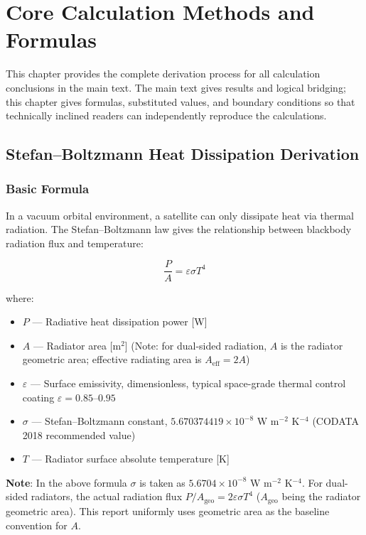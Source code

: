 
\section{Core Calculation Methods and Formulas}

This chapter provides the complete derivation process for all calculation conclusions in the main text. The main text gives results and logical bridging; this chapter gives formulas, substituted values, and boundary conditions so that technically inclined readers can independently reproduce the calculations.

\subsection{Stefan--Boltzmann Heat Dissipation Derivation}
\label{sec:sb-derivation}

\subsubsection{Basic Formula}

In a vacuum orbital environment, a satellite can only dissipate heat via thermal radiation. The Stefan--Boltzmann law gives the relationship between blackbody radiation flux and temperature:

\begin{equation}
  \frac{P}{A} = \varepsilon \sigma T^{4}
  \label{eq:sb-basic}
\end{equation}

where:
\begin{itemize}
  \item $P$ --- Radiative heat dissipation power [W]
  \item $A$ --- Radiator area [m$^2$] (Note: for dual-sided radiation, $A$ is the radiator geometric area; effective radiating area is $A_{\text{eff}} = 2A$)
  \item $\varepsilon$ --- Surface emissivity, dimensionless, typical space-grade thermal control coating $\varepsilon = 0.85\text{--}0.95$
  \item $\sigma$ --- Stefan--Boltzmann constant, $5.670374419 \times 10^{-8}$ W m$^{-2}$ K$^{-4}$ (CODATA 2018 recommended value)
  \item $T$ --- Radiator surface absolute temperature [K]
\end{itemize}

\textbf{Note}: In the above formula $\sigma$ is taken as $5.6704 \times 10^{-8}$ W m$^{-2}$ K$^{-4}$. For dual-sided radiators, the actual radiation flux $P/A_{\text{geo}} = 2\varepsilon\sigma T^{4}$ ($A_{\text{geo}}$ being the radiator geometric area). This report uniformly uses geometric area as the baseline convention for $A$.

